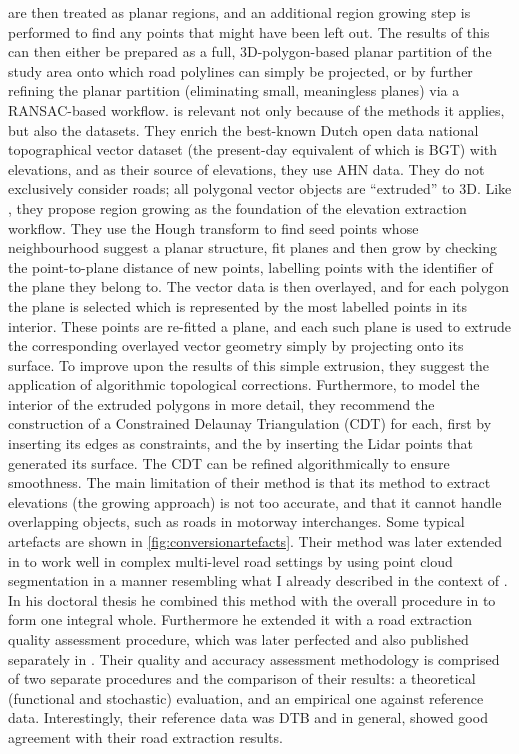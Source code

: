 are then treated as planar regions, and an additional region growing step is performed to find any points that might have been left out. The results of this can then either be prepared as a full, 3D-polygon-based planar partition of the study area onto which road polylines can simply be projected, or by further refining the planar partition (eliminating small, meaningless planes) via a RANSAC-based workflow. \cite{oudeElberink_vosselman_2006} is relevant not only because of the methods it applies, but also the datasets. They enrich the best-known Dutch open data national topographical vector dataset (the present-day equivalent of which is BGT) with elevations, and as their source of elevations, they use AHN data. They do not exclusively consider roads; all polygonal vector objects are “extruded” to 3D. Like \cite{hatger_brenner_2003}, they propose region growing as the foundation of the elevation extraction workflow. They use the Hough transform to find seed points whose neighbourhood suggest a planar structure, fit planes and then grow by checking the point-to-plane distance of new points, labelling points with the identifier of the plane they belong to. The vector data is then overlayed, and for each polygon the plane is selected which is represented by the most labelled points in its interior. These points are re-fitted a plane, and each such plane is used to extrude the corresponding overlayed vector geometry simply by projecting onto its surface. To improve upon the results of this simple extrusion, they suggest the application of algorithmic topological corrections. Furthermore, to model the interior of the extruded polygons in more detail, they recommend the construction of a Constrained Delaunay Triangulation (CDT) for each, first by inserting its edges as constraints, and the by inserting the Lidar points that generated its surface. The CDT can be refined algorithmically to ensure smoothness. The main limitation of their method is that its method to extract elevations (the growing approach) is not too accurate, and that it cannot handle overlapping objects, such as roads in motorway interchanges. Some typical artefacts are shown in \ref{fig:conversionartefacts}. Their method was later extended in \cite{oudeElberink_vosselman_2009} to work well in complex multi-level road settings by using point cloud segmentation in a manner resembling what I already described in the context of \cite{boyko_funkhauser_2011}. In his doctoral thesis \cite{oudeElberink_2010} he combined this method with the overall procedure in \cite{oudeElberink_vosselman_2006} to form one integral whole. Furthermore he extended it with a road extraction quality assessment procedure, which was later perfected and also published separately in \cite{oudeElberink_vosselman_2012}. Their quality and accuracy assessment methodology is comprised of two separate procedures and the comparison of their results: a theoretical (functional and stochastic) evaluation, and an empirical one against reference data. Interestingly, their reference data was DTB and in general, showed good agreement with their road extraction results.

